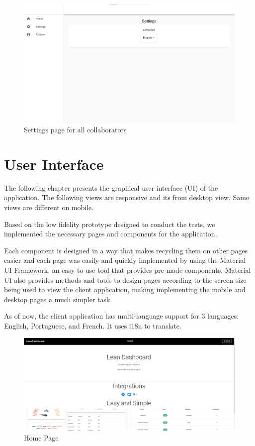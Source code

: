 \documentclass[a4paper,twoside,10pt]{report}
\begin{document}
\begin{figure}[h!]
\center
  \includegraphics[width=\textwidth]{settingsPageForCollaborators.png}
\caption{Settings page for all collaborators}
\end{figure}



\chapter{User Interface}
The following chapter presents the graphical user interface (UI) of the application. The following views are responsive and its from desktop view. Same views are different on mobile.

Based on the low fidelity prototype designed to conduct the tests, we implemented the necessary pages and components for the application.

Each component is designed in a way that makes recycling them on other pages easier and each page was easily and quickly implemented by using the Material UI Framework, an easy-to-use tool that provides pre-made components.
Material UI also provides methods and tools to design pages according to the screen size being used to view the client application, making implementing the mobile and desktop pages a much simpler task.

As of now, the client application has multi-language support for 3 languages: English, Portuguese, and French. It uses i18n to translate.
 
\begin{figure}[h!]
\center
  \includegraphics[width=\textwidth]{HomePage.png}
\caption{Home Page}
\end{figure}
\end{document}

